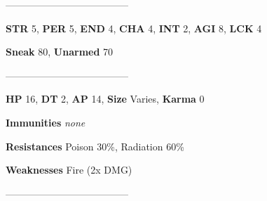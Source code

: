 \documentclass[11pt,a4paper,twocolumn]{book}
\begin{document}
--------------------------------------

\noindent
\textbf{STR} 5, \textbf{PER} 5, \textbf{END} 4, \textbf{CHA} 4, \textbf{INT} 2, \textbf{AGI} 8, \textbf{LCK} 4

\noindent
\textbf{Sneak} 80, \textbf{Unarmed} 70	%

--------------------------------------

\noindent
\textbf{HP} 16, \textbf{DT} 2, \textbf{AP} 14, \textbf{Size} Varies, \textbf{Karma} 0


\noindent
\textbf{Immunities} \emph{none} %

\noindent
\textbf{Resistances} Poison 30\%, Radiation 60\%%

\noindent
\textbf{Weaknesses}  Fire (2x DMG) %

--------------------------------------

	
\end{document}
